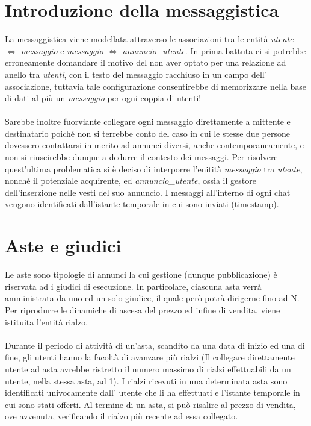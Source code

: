 \documentclass[a4paper,12pt]{report}
\begin{document}
    	\section{Introduzione della messaggistica}
        La messaggistica viene modellata attraverso le associazioni tra le entità \textit{utente $\Leftrightarrow$ messaggio} e 
        \textit{messaggio $\Leftrightarrow$ annuncio\_utente}. In prima battuta ci si potrebbe erroneamente domandare il motivo 
        del non aver optato per una relazione ad anello tra \textit{utenti}, con il testo del messaggio racchiuso in un campo 
        dell’ associazione, tuttavia tale configurazione consentirebbe di memorizzare nella base di dati al più un 
        \textit{messaggio} per ogni coppia di utenti! \\
        \\
        Sarebbe inoltre fuorviante collegare ogni messaggio direttamente 
        a mittente e destinatario poiché non si terrebbe conto del caso in cui le stesse due persone dovessero contattarsi in merito ad annunci 
        diversi, anche contemporaneamente, e non si riuscirebbe dunque a dedurre il contesto dei messaggi. Per risolvere quest’ultima problematica 
        si è deciso di interporre l'enitità \textit{messaggio} tra \textit{utente}, nonchè il potenziale acquirente, ed \textit{annuncio\_utente}, 
        ossia il gestore dell’inserzione nelle vesti del suo annuncio. I messaggi all’interno di ogni chat vengono identificati dall’istante 
        temporale in cui sono inviati (timestamp). \\
        
        \section{Aste e giudici}
        Le aste sono tipologie di annunci la cui gestione (dunque pubblicazione) è riservata ad i giudici di esecuzione.
        In particolare, ciascuna asta verrà amministrata da uno ed un solo giudice, il quale però potrà dirigerne fino ad N.
        Per riprodurre le dinamiche di ascesa del prezzo ed infine di vendita, viene istituita l’entità rialzo. \\
        \\
        Durante il periodo di attività di un’asta, scandito da una data di inizio ed una di fine, gli utenti hanno la facoltà di avanzare più rialzi 
        (Il collegare direttamente utente ad asta avrebbe ristretto il numero massimo di rialzi effettuabili da un utente, nella stessa asta, ad 1).
        I rialzi ricevuti in una determinata asta sono identificati univocamente dall’ utente che li ha effettuati e l’istante temporale in cui sono 
        stati offerti. Al termine di un asta, si può risalire al prezzo di vendita, ove avvenuta, verificando il rialzo più recente ad essa collegato.
\end{document}
